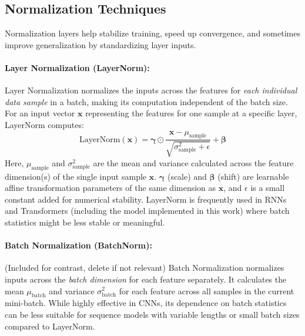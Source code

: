 \subsection{Normalization Techniques}
Normalization layers help stabilize training, speed up convergence, and sometimes improve generalization by standardizing layer inputs.

\paragraph{Layer Normalization (LayerNorm):}
Layer Normalization normalizes the inputs across the features for \textit{each individual data sample} in a batch, making its computation independent of the batch size. For an input vector \( \bm{x} \) representing the features for one sample at a specific layer, LayerNorm computes:
\begin{equation}
  \text{LayerNorm}(\bm{x}) = \bm{\gamma} \odot \frac{\bm{x} - \mu_{\text{sample}}}{\sqrt{\sigma^2_{\text{sample}} + \epsilon}} + \bm{\beta}
  \label{eq:layernorm}
\end{equation}
Here, \( \mu_{\text{sample}} \) and \( \sigma^2_{\text{sample}} \) are the mean and variance calculated across the feature dimension(s) of the single input sample \( \bm{x} \). \( \bm{\gamma} \) (scale) and \( \bm{\beta} \) (shift) are learnable affine transformation parameters of the same dimension as \( \bm{x} \), and \( \epsilon \) is a small constant added for numerical stability. LayerNorm is frequently used in RNNs and Transformers (including the model implemented in this work) where batch statistics might be less stable or meaningful.

\paragraph{Batch Normalization (BatchNorm):}
(Included for contrast, delete if not relevant) Batch Normalization normalizes inputs across the \textit{batch dimension} for each feature separately. It calculates the mean \( \mu_{\text{batch}} \) and variance \( \sigma^2_{\text{batch}} \) for each feature across all samples in the current mini-batch. While highly effective in CNNs, its dependence on batch statistics can be less suitable for sequence models with variable lengths or small batch sizes compared to LayerNorm.

